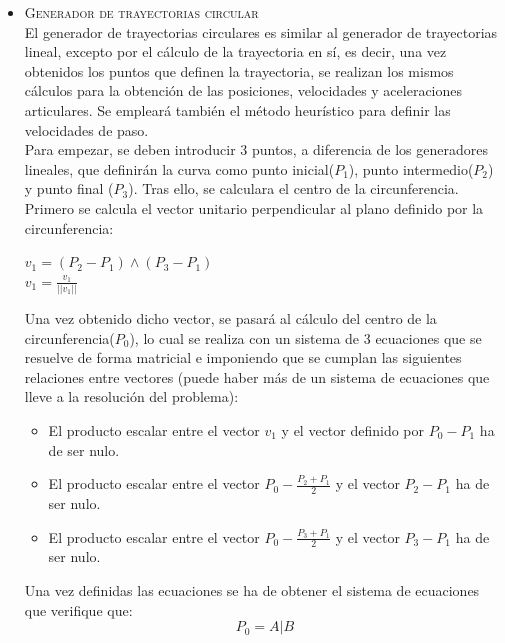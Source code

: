 \begin{itemize}
	\item \textsc{Generador de trayectorias circular}\\

	El generador de trayectorias circulares es similar al generador de trayectorias lineal, excepto por el cálculo de la trayectoria en sí, es decir, una vez obtenidos los puntos que definen la trayectoria, se realizan los mismos cálculos para la obtención de las posiciones, velocidades y aceleraciones articulares. Se empleará también el método heurístico para definir las velocidades de paso.\\

	Para empezar, se deben introducir 3 puntos, a diferencia de los generadores lineales, que definirán la curva como punto inicial($P_1$), punto intermedio($P_2$) y punto final ($P_3$). Tras ello, se calculara el centro de la circunferencia.\\

	Primero se calcula el vector unitario perpendicular al plano definido por la circunferencia:
	\begin{center}
	$v_1=(P_2-P_1)\wedge(P_3-P_1)$\\
	$v_1=\frac{v_1}{||v_1||}$\\
	\end{center}

	Una vez obtenido dicho vector, se pasará al cálculo del centro de la circunferencia($P_0$), lo cual se realiza con un sistema de 3 ecuaciones que se resuelve de forma matricial e imponiendo que se cumplan las siguientes relaciones entre vectores (puede haber más de un sistema de ecuaciones que lleve a la resolución del problema):

	\begin{itemize}
		\item El producto escalar entre el vector $v_1$ y el vector definido por $P_0-P_1$ ha de ser nulo.\\
		\item El producto escalar entre el vector $P_0-\frac{P_2+P_1}{2}$ y el vector $P_2-P_1$ ha de ser nulo.\\
		\item El producto escalar entre el vector $P_0-\frac{P_3+P_1}{2}$ y el vector $P_3-P_1$ ha de ser nulo.\\
	\end{itemize}

	Una vez definidas las ecuaciones se ha de obtener el sistema de ecuaciones que verifique que:\\
	\begin{equation}
		P_0=A|B
	\end{equation}


\end{itemize}
